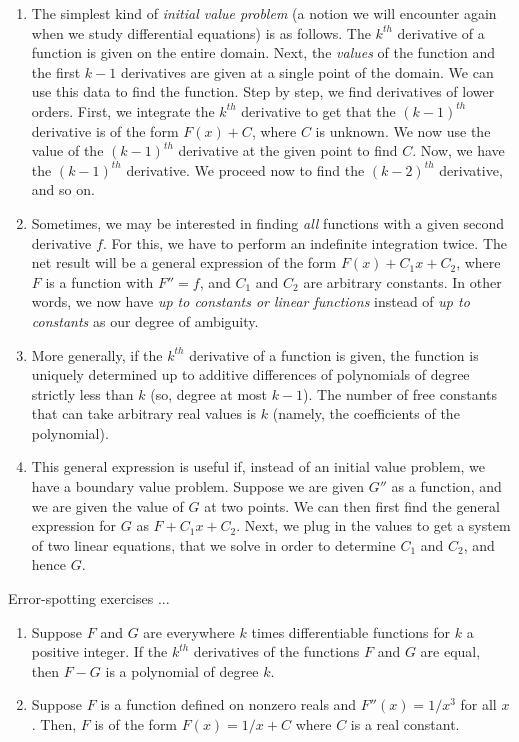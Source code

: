 \documentclass[10pt]{amsart}
\begin{document}
\begin{enumerate}
\item The simplest kind of {\em initial value problem} (a notion we
  will encounter again when we study differential equations) is as
  follows. The $k^{th}$ derivative of a function is given on the
  entire domain. Next, the {\em values} of the function and the first
  $k - 1$ derivatives are given at a single point of the domain. We
  can use this data to find the function. Step by step, we find
  derivatives of lower orders. First, we integrate the $k^{th}$
  derivative to get that the $(k-1)^{th}$ derivative is of the form
  $F(x) + C$, where $C$ is unknown. We now use the value of the
  $(k-1)^{th}$ derivative at the given point to find $C$. Now, we have
  the $(k-1)^{th}$ derivative. We proceed now to find the $(k-2)^{th}$
  derivative, and so on.
\item Sometimes, we may be interested in finding {\em all} functions
  with a given second derivative $f$. For this, we have to perform an
  indefinite integration twice. The net result will be a general
  expression of the form $F(x) + C_1x + C_2$, where $F$ is a function
  with $F'' = f$, and $C_1$ and $C_2$ are arbitrary constants. In
  other words, we now have {\em up to constants or linear functions}
  instead of {\em up to constants} as our degree of ambiguity.
\item More generally, if the $k^{th}$ derivative of a function is
  given, the function is uniquely determined up to additive
  differences of polynomials of degree strictly less than $k$ (so,
  degree at most $k - 1$). The number of free constants that can take
  arbitrary real values is $k$ (namely, the coefficients of the
  polynomial).
\item This general expression is useful if, instead of an initial
  value problem, we have a boundary value problem. Suppose we are
  given $G''$ as a function, and we are given the value of $G$ at two
  points. We can then first find the general expression for $G$ as $F
  + C_1x + C_2$. Next, we plug in the values to get a system of two
  linear equations, that we solve in order to determine $C_1$ and
  $C_2$, and hence $G$.
\end{enumerate}

Error-spotting exercises ...

\begin{enumerate}
\item Suppose $F$ and $G$ are everywhere $k$ times differentiable
  functions for $k$ a positive integer. If the $k^{th}$ derivatives of
  the functions $F$ and $G$ are equal, then $F - G$ is a polynomial of
  degree $k$.
\item Suppose $F$ is a function defined on nonzero reals and $F''(x) =
  1/x^3$ for all $x$. Then, $F$ is of the form $F(x) = 1/x + C$ where
  $C$ is a real constant.
\end{enumerate}
\end{document}
